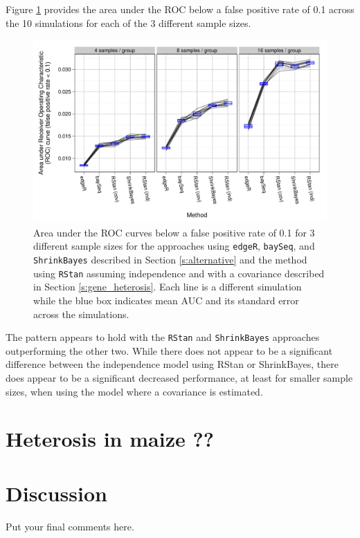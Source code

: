 \documentclass[useAMS,usenatbib,referee]{biom}
\begin{document}
Figure \ref{f:auc} provides the area under the ROC below a false positive rate of 0.1 across the 10 simulations for each of the 3 different sample sizes. 
\begin{figure}
\centerline{\includegraphics[width=\textwidth]{auc-facet-TRUE}}
\caption{Area under the ROC curves below a false positive rate of 0.1 for 3 different sample sizes for the approaches using {\tt edgeR}, {\tt baySeq},  and {\tt ShrinkBayes} described in Section \ref{s:alternative} and the method using {\tt RStan} assuming independence and with a covariance described in Section \ref{s:gene_heterosis}. Each line is a different simulation while the blue box indicates mean AUC and its standard error across the simulations.}
\label{f:auc}
\end{figure}
The pattern appears to hold with the {\tt RStan} and {\tt ShrinkBayes} approaches outperforming the other two. While there does not appear to be a significant difference between the independence model using RStan or ShrinkBayes, there does appear to be a significant decreased performance, at least for smaller sample sizes, when using the model where a covariance is estimated. 


\section{Heterosis in maize ??}
\label{s:corn}




\section{Discussion}
\label{s:discuss}

Put your final comments here. 
\end{document}
